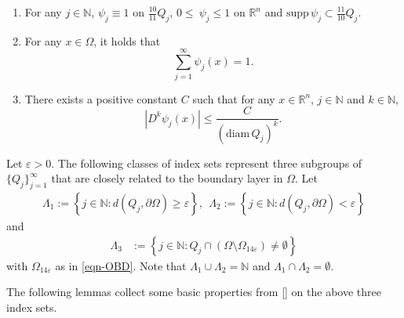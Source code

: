 \documentclass[11pt,twoside]{article}
\def\rn{{\mathbb{R}^n}}
\def\nn{{\mathbb N}}
\def\boz{{\Omega}}
\theoremstyle{mylem}
\theoremstyle{definition}
\numberwithin{equation}{section}
\begin{document}
\begin{enumerate}
\item[\rm(i)]
For any \(j\in\nn\), \( \psi_j \equiv 1 \) on \( \frac{10}{11}Q_j \), \(0\leq\ \psi_j\leq1\) on \(\rn\) and \( \text{supp}\,\psi_j \subset\frac{11}{10}Q_j \).
\item[\rm(ii)]For any \( x \in \Omega \), it holds that
\begin{equation}\label{eqn-2.1}
\sum_{j=1}^{\infty} \psi_j(x) = 1.
\end{equation}
\item[\rm(iii)]There exists a positive constant \( C \) such that for any \( x \in \mathbb{R}^n \), \(j\in\nn\) and \( k \in \mathbb{N} \),
\begin{equation}\label{eqn-2.2}
|D^{k}\psi_j(x)| \leq \frac{C}{(\mathrm{diam}\,Q_j)^{k}}. 
\end{equation}
\end{enumerate}
Let \( \varepsilon > 0 \). The following classes of index sets represent three subgroups of \( \{Q_j\}_{j=1}^{\infty} \) that are closely related to the boundary layer in \( \boz \). Let
\begin{align}\label{eqn-2.3}
\Lambda_1 := \left\{ j \in \mathbb{N} : d(Q_j, \partial\Omega) \geq \varepsilon \right\}, \ \ \Lambda_2 := \left\{ j \in \mathbb{N} : d(Q_j, \partial\Omega) < \varepsilon \right\}
\end{align}
and
\begin{align}\label{eqn-2.4}
\Lambda_3 &:= \left\{ j \in \mathbb{N} : Q_j \cap (\Omega \setminus \Omega_{14\varepsilon}) \neq \emptyset \right\}
\end{align} 
with \( \boz_{14\varepsilon} \) as in \eqref{eqn-OBD}. Note that $\Lambda_1\cup\Lambda_2=\mathbb{N}$ and $\Lambda_1\cap\Lambda_2=\emptyset$.

\medskip
The following lemmas collect some basic properties  from [\cite{cjlz2022}] on the above three index sets.
\end{document}
